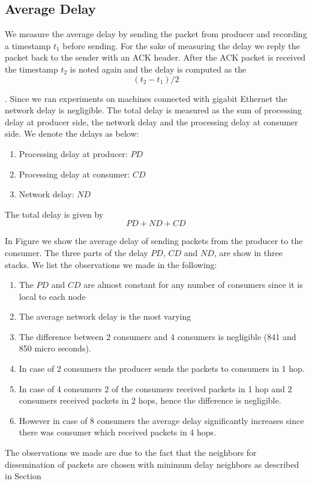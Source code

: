 \subsection{Average Delay}
We measure the average delay by sending the packet from producer and recording a timestamp $t_1$ before sending. For the sake of measuring the delay we reply the packet back to the sender with an ACK header. After the ACK packet is received the timestamp $t_2$ is noted again and the delay is computed as the 
\[
 (t_2-t_1)/2
\]

. Since we ran experiments on machines connected with gigabit Ethernet the network delay is negligible. The total delay is measured as the sum of processing delay at producer side, the network delay and the processing delay at consumer side. We denote the delays as below:
\begin{enumerate}
 \item Processing delay at producer: $PD$
\item Processing delay at consumer: $CD$
\item Network delay: $ND$
\end{enumerate}

The total delay is given by
\[
 PD + ND + CD
\]

In Figure \label{fig:delay} we show the average delay of sending packets from the producer to the consumer. The three parts of the delay $PD$, $CD$ and $ND$, are show in three stacks. We list the observations we made in the following:
\begin{enumerate}
 \item The $PD$ and $CD$ are almost constant for any number of consumers since it is local to each node
 \item The average network delay is the most varying 
 \item The difference between 2 consumers and 4 consumers is negligible (841 and 850 micro seconds). 
  \item In case of 2 consumers the producer sends the packets to consumers in 1 hop.
 \item In case of 4 consumers 2 of the consumers received packets in 1 hop and 2 consumers received packets in 2 hops, hence the difference is negligible.
\item However in case of 8 consumers the average delay significantly increases since there was consumer which received packets in 4 hops.
\end{enumerate}

The observations we made are due to the fact that the neighbors for dissemination of packets are chosen with minimum delay neighbors as described in Section 

